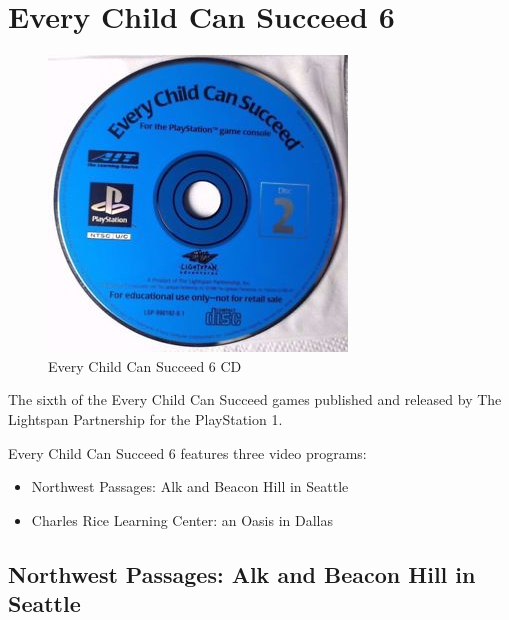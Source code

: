 \chapter{Every Child Can Succeed 6}

\begin{figure}[H]
    \centering
    \includegraphics[width=\textwidth/2]{./Games/EveryChildCanSucceed/Images/EveryChildCanSucceed6CD.jpg}
    \caption{Every Child Can Succeed 6 CD}
\end{figure}

The sixth of the Every Child Can Succeed games published and released by The Lightspan Partnership for the PlayStation 1.

Every Child Can Succeed 6 features three video programs:

\begin{itemize}
    \item Northwest Passages: Alk and Beacon Hill in Seattle
    \item Charles Rice Learning Center: an Oasis in Dallas
\end{itemize}

\clearpage
\newpage

\section{Northwest Passages: Alk and Beacon Hill in Seattle}

